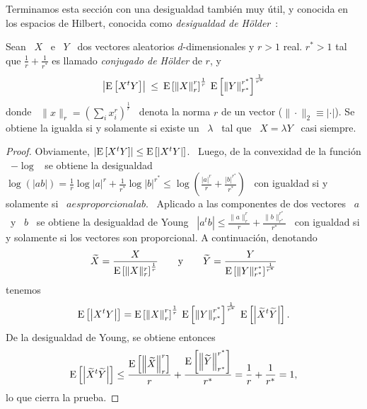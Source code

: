 Terminamos esta secci\'on  con una desigualdad tambi\'en muy  \'util, y conocida
en   los   espacios   de    Hilbert,   conocida   como   {\it   desigualdad   de
  H\"older}~\cite{Hol98}:
%
\begin{teorema}
  Sean \  $X$ \ e \  $Y$ \ dos vectores  aleatorios $d$-dimensionales y  $r > 1$
  real. $r^* >  1$ tal que $\frac1r + \frac1{r^*}$ es  llamado {\it conjugado de
    H\"older} de $r$, y
  \[
  \left|  \operatorname{E}\left[  X^t Y  \right]  \right| \:  \le  \:  \operatorname{E}\left[ \left\|  X
    \right\|_r^r   \right]^{\frac1r}  \:  \operatorname{E}\left[   \left\|  Y
    \right\|_{r^*}^{r^*} \right]^{\frac1{r^*}}
  \]
  donde \ $\| x \|_r =  \left( \sum_i x_i^r \right)^{\frac1r}$ \ denota la norma
  $r$ de un  vector ($\|\cdot\|_2 \equiv |\cdot|$).  Se obtiene  la igualda si y
  solamente si existe un \ $\lambda$ \ tal que \ $X = \lambda Y$ \ casi siempre.
\end{teorema}
%
\begin{proof}
  Obviamente, $\left| \operatorname{E}\left[ X^t Y \right] \right| \le \operatorname{E}\left[ \left| X^t
      Y \right| \right]$. \ Luego, de  la convexidad de la funci\'on \ $-\log$ \
  se  obtiene  la  desigualdad  \  $\log(|a  b|) =  \frac1r  \log  |a|^r  +
  \frac1{r^*} \log  |b|^{r^*} \le \log\left( \frac{|a|^r}{r}
    + \frac{|b|^{r^*}}{r^*} \right)$ \  con igualdad si y solamente si
  \ $a es proporcional a b$. \  Aplicado a las componentes de dos vectores \ $a$
  \ y  \ $b$ \ se  obtiene la desigualdad de  Young \ $\left| a^t  b \right| \le
  \frac{\|a\|_r^r}{r}                                            +
  \frac{\|b\|_{r^*}^{r^*}}{r^*}$ \ con igualdad si y solamente si
  los vectores son proporcional. A continuaci\'on, denotando
  \[
  \widetilde{X}         =         \frac{X}{\operatorname{E}\left[        \|X\|_r^r
    \right]^{\frac1r}}    \qquad    \mbox{y}    \qquad   \widetilde{Y}    =
  \frac{Y}{\operatorname{E}\left[ \|Y\|_{r^*}^{r^*} \right]^{\frac1{r^*}}}
  \]
  tenemos
  \[
  \operatorname{E}\left[   \left|   X^t  Y   \right|   \right]   =   \operatorname{E}\left[  \left\|   X
    \right\|_r^r   \right]^{\frac1r}  \:  \operatorname{E}\left[   \left\|  Y
    \right\|_{r^*}^{r^*}   \right]^{\frac1{r^*}}   \:  \operatorname{E}\left[
    \left| \widetilde{X}^t \widetilde{Y} \right| \right].
  \]
  De la desigualdad de Young, se obtiene entonces
  \[
  \operatorname{E}\left[   \left|   \widetilde{X}^t   \widetilde{Y}  \right|   \right]   \le
  \frac{\operatorname{E}\left[ \left\| \widetilde{X} \right\|_r^r \right]}{r}
  +   \frac{\operatorname{E}\left[   \left\|  \widetilde{Y}   \right\|_{r^*}^{r^*}
    \right]}{r^*} = \frac1r + \frac1{r^*} = 1,
  \]
  lo que cierra la prueba.
\end{proof}

